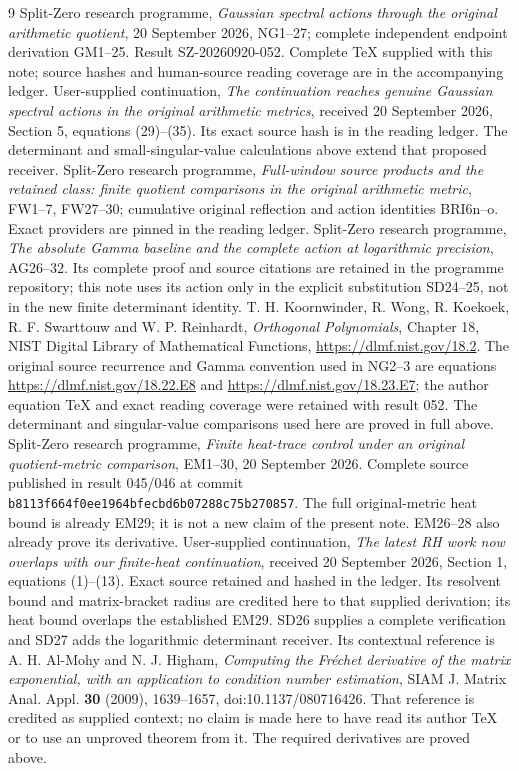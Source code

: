 \begin{thebibliography}{9}
 Split-Zero research programme, \emph{Gaussian spectral
actions through the original arithmetic quotient}, 20 September 2026,
NG1--27; complete independent endpoint derivation GM1--25. Result
SZ-20260920-052. Complete TeX supplied with this note; source hashes and
human-source reading coverage are in the accompanying ledger.
 User-supplied continuation, \emph{The continuation
reaches genuine Gaussian spectral actions in the original arithmetic
metrics}, received 20 September 2026, Section 5, equations (29)--(35).
Its exact source hash is in the reading ledger. The determinant and
small-singular-value calculations above extend that proposed receiver.
 Split-Zero research programme, \emph{Full-window source
products and the retained class: finite quotient comparisons in the
original arithmetic metric}, FW1--7, FW27--30; cumulative original
reflection and action identities BRI6n--o. Exact providers are pinned
in the reading ledger.
 Split-Zero research programme, \emph{The absolute Gamma
baseline and the complete action at logarithmic precision}, AG26--32.
Its complete proof and source citations are retained in the programme
repository; this note uses its action only in the explicit substitution
SD24--25, not in the new finite determinant identity.
 T. H. Koornwinder, R. Wong, R. Koekoek,
R. F. Swarttouw and W. P. Reinhardt, \emph{Orthogonal Polynomials},
Chapter 18, NIST Digital Library of Mathematical Functions,
\url{https://dlmf.nist.gov/18.2}. The original source recurrence and
Gamma convention used in NG2--3 are equations
\url{https://dlmf.nist.gov/18.22.E8} and
\url{https://dlmf.nist.gov/18.23.E7}; the author equation TeX and exact
reading coverage were retained with result 052. The determinant and
singular-value comparisons used here are proved in full above.
 Split-Zero research programme, \emph{Finite heat-trace
control under an original quotient-metric comparison}, EM1--30,
20 September 2026. Complete source published in result 045/046 at
commit \nolinkurl{b8113f664f0ee1964bfecbd6b07288c75b270857}.
The full original-metric heat bound is already EM29; it is not a new
claim of the present note. EM26--28 also already prove its derivative.
 User-supplied continuation, \emph{The latest RH
work now overlaps with our finite-heat continuation}, received
20 September 2026, Section 1, equations (1)--(13). Exact source retained
and hashed in the ledger. Its resolvent bound and matrix-bracket radius
are credited here to that supplied derivation; its heat bound overlaps
the established EM29. SD26 supplies a complete verification and SD27 adds the logarithmic
determinant receiver. Its contextual reference is A. H. Al-Mohy and
N. J. Higham, \emph{Computing the Fr\'echet derivative of the matrix
exponential, with an application to condition number estimation},
SIAM J. Matrix Anal. Appl. \textbf{30} (2009), 1639--1657,
doi:10.1137/080716426. That reference is credited as supplied context;
no claim is made here to have read its author TeX or to use an unproved
theorem from it. The required derivatives are proved above.
\end{thebibliography}

